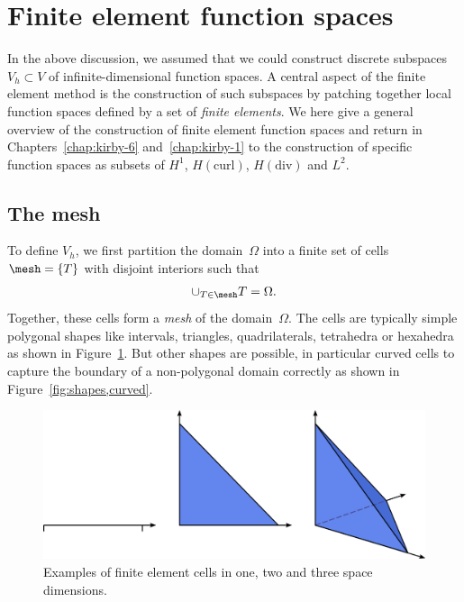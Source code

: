 \section{Finite element function spaces}

In the above discussion, we assumed that we could construct discrete
subspaces $V_h \subset V$ of infinite-dimensional function spaces. A
central aspect of the finite element method is the construction of
such subspaces by patching together local function spaces defined by a
set of \emph{finite elements}. We here give a general overview of the
construction of finite element function spaces and return in
Chapters~\ref{chap:kirby-6} and~\ref{chap:kirby-1} to the construction
of specific function spaces as subsets of $H^1$, $H(\mathrm{curl})$,
$H(\mathrm{div})$ and $L^2$.

\subsection{The mesh}

To define $V_h$, we first partition the domain~$\Omega$ into a finite
set of cells $\mesh = \{T\}$ with disjoint interiors such that
\begin{equation}
  \cup_{T\in\mesh} T = \Omega.
\end{equation}
Together, these cells form a \emph{mesh} of the domain~$\Omega$. The
cells are typically simple polygonal shapes like intervals, triangles,
quadrilaterals, tetrahedra or hexahedra as shown in
Figure~\ref{fig:shapes}. But other shapes are possible, in particular
curved cells to capture the boundary of a non-polygonal domain
correctly as shown in Figure~\ref{fig:shapes,curved}.

\begin{figure}
  \center\includegraphics[width=\largefig]{chapters/kirby-7/pdf/cells.pdf}
  \caption{Examples of finite element cells in one, two and three
    space dimensions.}
  \label{fig:shapes}
\end{figure}

